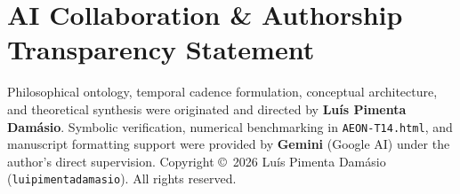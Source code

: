 \documentclass[11pt,a4paper]{article}
\begin{document}
\section*{AI Collaboration \& Authorship Transparency Statement}
Philosophical ontology, temporal cadence formulation, conceptual architecture, and theoretical synthesis were originated and directed by \textbf{Luís Pimenta Damásio}. Symbolic verification, numerical benchmarking in \texttt{AEON-T14.html}, and manuscript formatting support were provided by \textbf{Gemini} (Google AI) under the author's direct supervision. Copyright \copyright\ 2026 Luís Pimenta Damásio (\texttt{luipimentadamasio}). All rights reserved.



\end{document}
